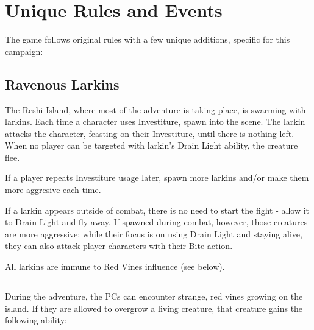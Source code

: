 \section{Unique Rules and Events}

The game follows original \cosmereRPG{} rules with a few unique additions, specific for this campaign:


\subsection{Ravenous Larkins}

The Reshi Island, where most of the adventure is taking place, is swarming with larkins. Each time a character uses Investiture, spawn \enemyLarkin{} into the scene. The larkin attacks the character, feasting on their Investiture, until there is nothing left. When no player can be targeted with larkin's Drain Light ability, the creature flee.

If a player repeats Investiture usage later, spawn more larkins and/or make them more aggresive each time.

If a larkin appears outside of combat, there is no need to start the fight - allow it to Drain Light and fly away. If spawned during combat, however, those creatures are more aggressive: while their focus is on using Drain Light and staying alive, they can also attack player characters with their Bite action.

All larkins are immune to Red Vines influence (see below).



\newpage %

\subsection{\abilityVinesName}
\label{ssec:ruleVines}

During the adventure, the PCs can encounter strange, red vines growing on the island. If they are allowed to overgrow a living creature, that creature gains the following ability:

